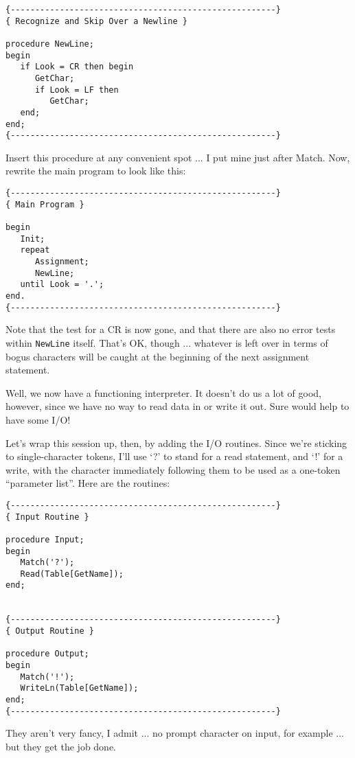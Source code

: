 \begin{verbatim}
{------------------------------------------------------}
{ Recognize and Skip Over a Newline }

procedure NewLine;
begin
   if Look = CR then begin
      GetChar;
      if Look = LF then
         GetChar;
   end;
end;
{------------------------------------------------------}
\end{verbatim}

Insert this procedure at any convenient spot ... I put  mine just after Match. Now, rewrite the main program to look like this:

\begin{verbatim}
{------------------------------------------------------}
{ Main Program }

begin
   Init;
   repeat
      Assignment;
      NewLine;
   until Look = '.';
end.
{------------------------------------------------------}
\end{verbatim}

Note that the  test for a CR is now gone, and that there are also no  error tests within {\tt NewLine} itself. That's  OK, though  ... whatever is left over in terms of bogus characters will be caught at the beginning of the next assignment statement.

Well, we now have a functioning interpreter. It doesn't do  us a lot of  good, however, since  we have no way to read data in or write it out. Sure would help to have some I/O!

Let's wrap this session  up, then, by  adding the I/O routines. Since we're  sticking to single-character tokens, I'll use `?' to stand for a read statement, and  `!'  for a write, with the character  immediately  following  them  to  be used as  a  one-token ``parameter list''.  Here are the routines:

\begin{verbatim}
{------------------------------------------------------}
{ Input Routine }

procedure Input;
begin
   Match('?');
   Read(Table[GetName]);
end;


{------------------------------------------------------}
{ Output Routine }

procedure Output;
begin
   Match('!');
   WriteLn(Table[GetName]);
end;
{------------------------------------------------------}
\end{verbatim}

They aren't very fancy, I admit ... no prompt character on input, for example ... but they get the job done.

